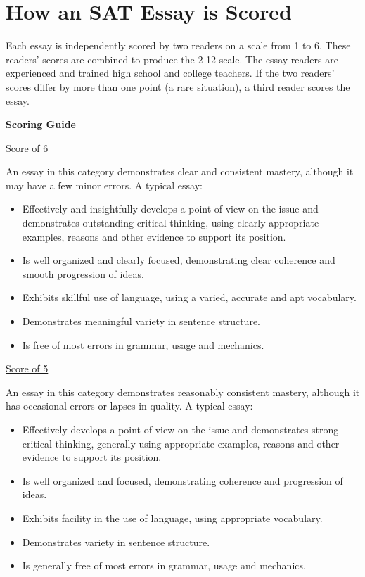 \documentclass[12pt]{book}
\begin{document}
\vfill
\newpage

\section{How an SAT Essay is Scored}
Each essay is independently scored by two readers on a scale from 1 to 6. These readers' scores are combined to produce the 2-12 scale. The essay readers are experienced and trained high school and college teachers.
If the two readers' scores differ by more than one point (a rare situation), a third reader scores the essay.

\begin{center}
\textbf{Scoring Guide}
\end{center}

\bigskip
\underline{Score of 6}

An essay in this category demonstrates clear and consistent mastery, although it may have a few minor errors. A typical essay:

\begin{itemize}
\item{Effectively and insightfully develops a point of view on the issue and demonstrates outstanding critical thinking, using clearly appropriate examples, reasons and other evidence to support its position.}
\item{Is well organized and clearly focused, demonstrating clear coherence and smooth progression of ideas.}
\item{Exhibits skillful use of language, using a varied, accurate and apt vocabulary.}
\item{Demonstrates meaningful variety in sentence structure.}
\item{Is free of most errors in grammar, usage and mechanics.}
\end{itemize}

\vfill
\underline{Score of 5}

An essay in this category demonstrates reasonably consistent mastery, although it has occasional errors or lapses in quality. A typical essay:

\begin{itemize}
\item{Effectively develops a point of view on the issue and demonstrates strong critical thinking, generally using appropriate examples, reasons and other evidence to support its position.}
\item{Is well organized and focused, demonstrating coherence and progression of ideas.}
\item{Exhibits facility in the use of language, using appropriate vocabulary.}
\item{Demonstrates variety in sentence structure.}
\item{Is generally free of most errors in grammar, usage and mechanics.}
\end{itemize}
\end{document}

